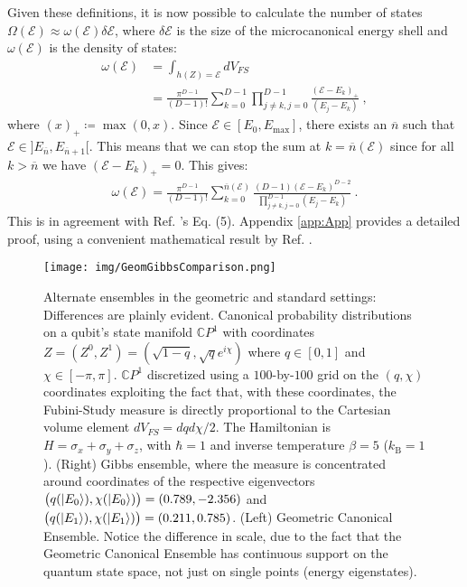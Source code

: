 \documentclass[draft,nofootinbib,pre,twocolumn,showpacs,showkeys,groupaddress,preprintnumbers,floatfix]{revtex4-1}
\newcommand{\kB}{k_\text{B}}
\newcommand{\1}{\mathbbm{1}}
\begin{document}
Given these definitions, it is now possible to calculate the number of states
$\Omega(\mathcal{E}) \approx \omega(\mathcal{E}) \delta \mathcal{E}$, where
$\delta \mathcal{E}$ is the size of the microcanonical energy shell and
$\omega(\mathcal{E})$ is the density of states:
\begin{align*}
\omega(\mathcal{E}) & = \int_{h(Z)=\mathcal{E}} dV_{FS} \\
  & = \frac{\pi^{D-1}}{(D-1)!}  \sum_{k=0}^{D-1}
  \prod_{j \neq k, j=0}^{D-1} \frac{(\mathcal{E}-E_k)_{+}}{(E_j-E_k)}
  ~,
\end{align*}
where $(x)_{+} \coloneqq \max (0,x)$.
Since $\mathcal{E} \in [E_0,E_{\mathrm{max}}]$, there exists an $\overline{n}$
such that $\mathcal{E} \in ] E_{\overline{n}},E_{\overline{n}+1} [$. This means
that we can stop the sum at $k=\overline{n}(\mathcal{E})$ since for all $k >
\overline{n}$ we have $(\mathcal{E}-E_k)_+ = 0$. This gives:
\begin{align}
\omega(\mathcal{E}) =
  \frac{\pi^{D-1}}{(D-1)!}
  \sum_{k=0}^{\overline{n}(\mathcal{E})}
  \frac{(D-1)(\mathcal{E}-E_k)^{D-2}}{\prod_{j \neq k, j=0}^{D-1} (E_j-E_k)}
\label{eq:mc_density}
  ~.
\end{align}
This is in agreement with Ref. \cite{Brody2007}'s Eq. (5). Appendix
\ref{app:App} provides a detailed proof, using a convenient mathematical result
by Ref. \cite{Lasserre2015}.

\begin{figure}[h]
\centering
\texttt{[image: img/GeomGibbsComparison.png]}
\caption{Alternate ensembles in the geometric and standard settings:
	Differences are plainly evident. Canonical probability distributions on a
	qubit's state manifold $\mathbb{C}P^1$ with coordinates $Z = (Z^0,Z^1) =
	(\sqrt{1-q},\sqrt{q}e^{i\chi})$ where $q \in [0,1]$ and $\chi \in
	[-\pi,\pi]$. $\mathbb{C}P^1$ discretized using a $100$-by-$100$ grid on the
	$(q,\chi)$ coordinates exploiting the fact that, with these coordinates,
	the Fubini-Study measure is directly proportional to the Cartesian volume
	element $dV_{FS} = dq d\chi / 2$. The Hamiltonian is $H = \sigma_x +
	\sigma_y + \sigma_z$, with $\hbar=1$ and inverse temperature $\beta = 5$
	($\kB = 1$). (Right) Gibbs ensemble, where the measure is concentrated around
	coordinates of the respective eigenvectors
	$\big(q(\ket{E_0}),\chi(\ket{E_0})\big) = (0.789,-2.356)$ and
	$\big(q(\ket{E_1}),\chi(\ket{E_1})\big) = (0.211,0.785)$.
	(Left) Geometric Canonical Ensemble. Notice the difference in scale, due to the
	fact that the Geometric Canonical Ensemble has continuous support on the 
	quantum state space, not just on single points (energy eigenstates).
	}
\label{fig:Comparison} 
\end{figure}
\end{document}
